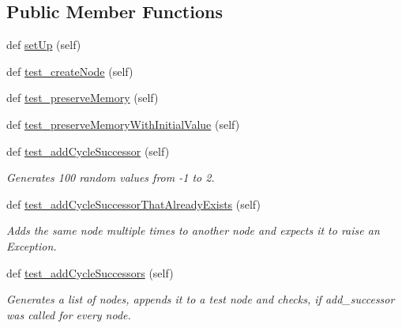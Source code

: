 \subsection*{Public Member Functions}
\begin{DoxyCompactItemize}
\item 
def \hyperlink{classNEAT__PyGenetics_1_1NEAT_1_1Tests_1_1SimulationGenomeTests_1_1test__simulationNodes_1_1TestSimulationCycleNode_ae8c352cdd9202aa02c85f6514e896e46}{set\+Up} (self)
\item 
def \hyperlink{classNEAT__PyGenetics_1_1NEAT_1_1Tests_1_1SimulationGenomeTests_1_1test__simulationNodes_1_1TestSimulationCycleNode_aff6a6b849ab9b0d2f266e46753e06bd0}{test\+\_\+create\+Node} (self)
\item 
def \hyperlink{classNEAT__PyGenetics_1_1NEAT_1_1Tests_1_1SimulationGenomeTests_1_1test__simulationNodes_1_1TestSimulationCycleNode_aa2a6c739540eaa41276a31be0c8ef619}{test\+\_\+preserve\+Memory} (self)
\item 
def \hyperlink{classNEAT__PyGenetics_1_1NEAT_1_1Tests_1_1SimulationGenomeTests_1_1test__simulationNodes_1_1TestSimulationCycleNode_a5b6c8cba78559d3d4fbe1336fda1569b}{test\+\_\+preserve\+Memory\+With\+Initial\+Value} (self)
\item 
def \hyperlink{classNEAT__PyGenetics_1_1NEAT_1_1Tests_1_1SimulationGenomeTests_1_1test__simulationNodes_1_1TestSimulationCycleNode_af290d2156db85e2109ef6722c25eb213}{test\+\_\+add\+Cycle\+Successor} (self)
\begin{DoxyCompactList}\small\item\em Generates 100 random values from -\/1 to 2. \end{DoxyCompactList}\item 
def \hyperlink{classNEAT__PyGenetics_1_1NEAT_1_1Tests_1_1SimulationGenomeTests_1_1test__simulationNodes_1_1TestSimulationCycleNode_abd65f6b19f91eb3796411a7bc6f60cb0}{test\+\_\+add\+Cycle\+Successor\+That\+Already\+Exists} (self)
\begin{DoxyCompactList}\small\item\em Adds the same node multiple times to another node and expects it to raise an Exception. \end{DoxyCompactList}\item 
def \hyperlink{classNEAT__PyGenetics_1_1NEAT_1_1Tests_1_1SimulationGenomeTests_1_1test__simulationNodes_1_1TestSimulationCycleNode_ae41ca9680b1fc37c9033e68fab641eb5}{test\+\_\+add\+Cycle\+Successors} (self)
\begin{DoxyCompactList}\small\item\em Generates a list of nodes, appends it to a test node and checks, if add\+\_\+successor was called for every node. \end{DoxyCompactList}\item 

\end{DoxyCompactItemize}
